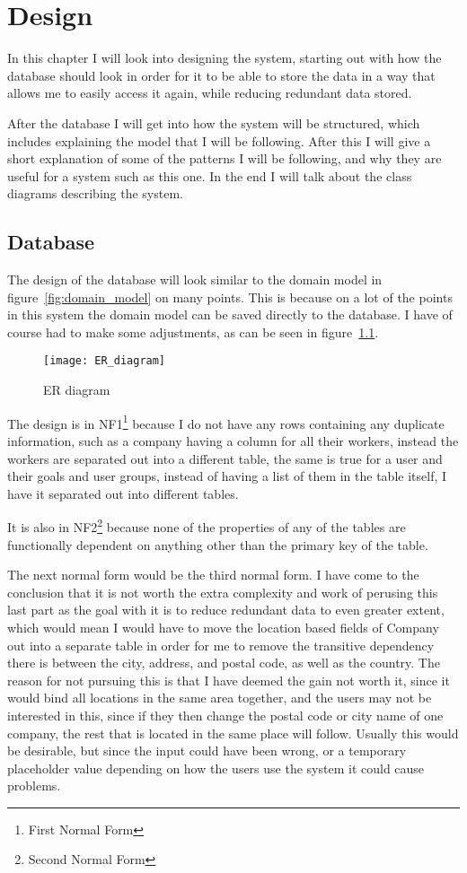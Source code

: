 \chapter{Design}
\label{chap:Design}
In this chapter I will look into designing the system, starting out with how the
database should look in order for it to be able to store the data in a way that
allows me to easily access it again, while reducing redundant data stored. 

After the database I will get into how the system will be structured, which
includes explaining the model that I will be following. After this I will give a
short explanation of some of the patterns I will be following, and why they are
useful for a system such as this one. In the end I will talk about the class
diagrams describing the system.

\section{Database}
\label{sec:Database}
The design of the database will look similar to the domain model
in figure~\ref{fig:domain_model} on many points. This is because on a lot of the
points in this system the domain model can be saved directly to the database. I
have of course had to make some adjustments, as can be seen in
figure~\ref{fig:er_diagram}.

\begin{figure}
  \texttt{[image: ER\_diagram]}
  \caption{ER diagram}
\label{fig:er_diagram}
\end{figure}

The design is in NF1\footnote{First Normal Form} because I do not have any rows
containing any duplicate information, such as a company having a column for all
their workers, instead the workers are separated out into a different
table\cite[p.~430]{DB_systems}, the same is true for a user and their goals and
user groups, instead of having a list of them in the table itself, I have it
separated out into different tables. 

It is also in NF2\footnote{Second Normal Form} because none of the properties of
any of the tables are functionally dependent on anything other than the primary
key of the table\cite[p.~434]{DB_systems}. 

The next normal form would be the third normal form. I have come to the
conclusion that it is not worth the extra complexity and work of perusing this
last part as the goal with it is to reduce redundant data to even greater
extent, which would mean I would have to move the location based fields of
Company out into a separate table in order for me to remove the transitive
dependency\cite[p.~436]{DB_systems} there is between the city, address, and
postal code, as well as the country. The reason for not pursuing this is that I
have deemed the gain not worth it, since it would bind all locations in the same
area together, and the users may not be interested in this, since if they then
change the postal code or city name of one company, the rest that is located in
the same place will follow. Usually this would be desirable, but since the input
could have been wrong, or a temporary placeholder value depending on how the
users use the system it could cause problems. 

